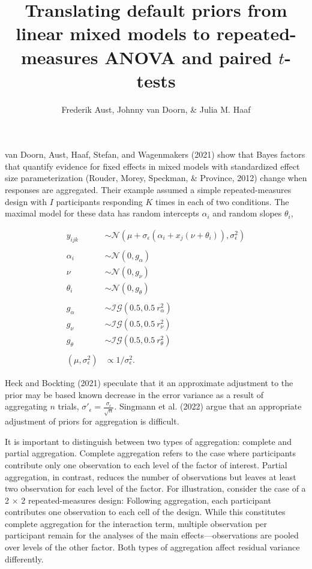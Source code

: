 \documentclass[
  man,floatsintext,draftall]{apa6}
\title{Translating default priors from linear mixed models to repeated-measures ANOVA and paired \(t\)-tests}
\author{Frederik Aust\textsuperscript{}, Johnny van Doorn\textsuperscript{}, \& Julia M. Haaf\textsuperscript{}}
\date{}
\affiliation{\vspace{0.5cm}\textsuperscript{} University of Amsterdam}
\begin{document}
\maketitle

van Doorn, Aust, Haaf, Stefan, and Wagenmakers (2021) show that Bayes factors that quantify evidence for fixed effects in mixed models with standardized effect size parameterization (Rouder, Morey, Speckman, \& Province, 2012) change when responses are aggregated.
Their example assumed a simple repeated-measures design with \(I\) participants responding \(K\) times in each of two conditions.
The maximal model for these data has random intercepts \(\alpha_i\) and random slopes \(\theta_i\),

\[
\begin{aligned}
y_{ijk} & \sim \mathcal{N}(\mu + \sigma_\epsilon (\alpha_i + x_j (\nu + \theta_i)), \sigma^2_\epsilon) \\ & \\
\alpha_i & \sim \mathcal{N}(0, g_\alpha) \\
\nu & \sim \mathcal{N}(0, g_{\nu}) \\
\theta_i & \sim \mathcal{N}(0, g_\theta) \\ & \\
g_{\alpha} & \sim \mathcal{IG}(0.5, 0.5~r_{\alpha}^2) \\
g_{\nu} & \sim \mathcal{IG}(0.5, 0.5~r_{\nu}^2) \\
g_{\theta} & \sim \mathcal{IG}(0.5, 0.5~r_{\theta}^2) \\ & \\
(\mu, \sigma^2_\epsilon) & \propto 1/\sigma^2_\epsilon.
\end{aligned}
\]

Heck and Bockting (2021) speculate that it an approximate adjustment to the prior may be based known decrease in the error variance as a result of aggregating \(n\) trials, \(\sigma\prime_\epsilon = \frac{\sigma_\epsilon}{\sqrt{n}}\).
Singmann et al. (2022) argue that an appropriate adjustment of priors for aggregation is difficult.

It is important to distinguish between two types of aggregation: complete and partial aggregation.
Complete aggregation refers to the case where participants contribute only one observation to each level of the factor of interest.
Partial aggregation, in contrast, reduces the number of observations but leaves at least two observation for each level of the factor.
For illustration, consider the case of a 2 \(\times\) 2 repeated-measures design:
Following aggregation, each participant contributes one observation to each cell of the design.
While this constitutes complete aggregation for the interaction term, multiple observation per participant remain for the analyses of the main effects---observations are pooled over levels of the other factor.
Both types of aggregation affect residual variance differently.
\end{document}
